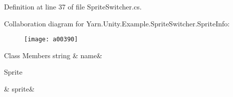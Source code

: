 Definition at line 37 of file Sprite\-Switcher.\-cs.



Collaboration diagram for Yarn.\-Unity.\-Example.\-Sprite\-Switcher.\-Sprite\-Info\-:
\nopagebreak
\begin{figure}[H]
\begin{center}
\leavevmode
\texttt{[image: a00390]}
\end{center}
\end{figure}
\begin{DoxyFields}{Class Members}
\hypertarget{a00165_a3f5bca2fff413dfe075c1fcf7e58369c}{string}\label{a00165_a3f5bca2fff413dfe075c1fcf7e58369c}
&
name&
\\
\hline

\hypertarget{a00165_adc58df011dc2841837b6cf775b372061}{Sprite}\label{a00165_adc58df011dc2841837b6cf775b372061}
&
sprite&
\\
\hline

\end{DoxyFields}
